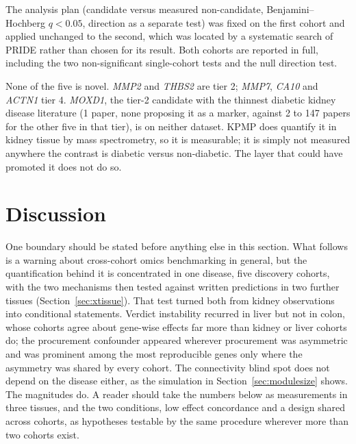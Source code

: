 \documentclass[pdflatex,sn-vancouver-num]{sn-jnl}
\theoremstyle{thmstyleone}
\theoremstyle{thmstyletwo}
\theoremstyle{thmstylethree}
\begin{document}
The analysis plan (candidate versus measured non-candidate, Benjamini--Hochberg \cite{benjamini1995} $q < 0.05$,
direction as a separate test) was fixed on the first cohort and applied unchanged to the
second, which was located by a systematic search of PRIDE rather than chosen for its result.
Both cohorts are reported in full, including the two non-significant single-cohort tests and
the null direction test.

None of the five is novel. \textit{MMP2} and \textit{THBS2} are tier 2; \textit{MMP7}, \textit{CA10} and
\textit{ACTN1} tier 4. \textit{MOXD1}, the tier-2 candidate with the thinnest diabetic kidney disease
literature (1 paper, none proposing it as a marker, against 2 to 147 papers for the other
five in that tier), is on neither dataset. KPMP does quantify it in kidney tissue by mass
spectrometry, so it is measurable; it is simply not measured anywhere the contrast is
diabetic versus non-diabetic. The layer that could have promoted it does not do so.

\section{Discussion}\label{sec:discussion}

One boundary should be stated before anything else in this section. What follows is a warning
about cross-cohort omics benchmarking in general, but the quantification behind it is
concentrated in one disease, five discovery cohorts, with the two mechanisms then tested against
written predictions in two further tissues (Section~\ref{sec:xtissue}). That test turned both
from kidney observations into conditional statements. Verdict instability recurred in liver but
not in colon, whose cohorts agree about gene-wise effects far more than kidney or liver cohorts
do; the procurement confounder appeared wherever procurement was asymmetric and was prominent among
the most reproducible genes only where the asymmetry was shared by every cohort. The connectivity blind
spot does not depend on the disease either, as the simulation in Section~\ref{sec:modulesize}
shows. The magnitudes do. A reader should take the numbers below as measurements in three
tissues, and the two conditions, low effect concordance and a design shared across cohorts, as
hypotheses testable by the same procedure wherever more than two cohorts exist.
\end{document}

